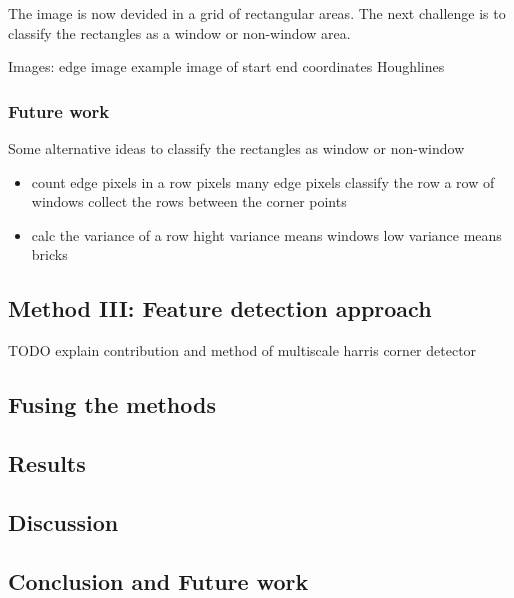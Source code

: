 The image is now devided in a grid of rectangular areas. The next challenge is to 
classify the rectangles as a window or non-window area.


Images:
edge image
example image of start end coordinates Houghlines


\subsubsection{Future work}
Some alternative ideas to classify the rectangles as window or non-window
\begin{itemize}
	\item count edge pixels in a row pixels
		many edge pixels classify the row a row of windows
		collect the rows between the corner points
	\item calc the variance of a row
		hight variance means windows
		low variance means bricks
\end{itemize}


\subsection{Method III: Feature detection approach}
	TODO explain contribution and method of multiscale harris corner detector

\subsection{Fusing the methods}

\subsection{Results}
\subsection{Discussion}  %
\subsection{Conclusion and Future work}




% 
% 
% 
% 
% 
% 
% 
% 
